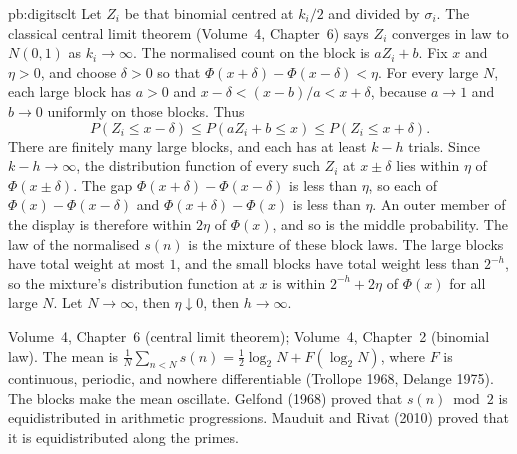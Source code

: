 \begin{solution}{pb:digitsclt}
Let $Z_i$ be that binomial centred at $k_i/2$ and divided by $\sigma_i$. The classical central limit theorem (Volume~4, Chapter~6) says $Z_i$ converges in law to $N(0,1)$ as $k_i\to\infty$. The normalised count on the block is $aZ_i+b$. Fix $x$ and $\eta>0$, and choose $\delta>0$ so that $\Phi(x+\delta)-\Phi(x-\delta)<\eta$. For every large $N$, each large block has $a>0$ and $x-\delta<(x-b)/a<x+\delta$, because $a\to1$ and $b\to0$ uniformly on those blocks. Thus
\[
P(Z_i\le x-\delta)\le P(aZ_i+b\le x)\le P(Z_i\le x+\delta).
\]
There are finitely many large blocks, and each has at least $k-h$ trials. Since $k-h\to\infty$, the distribution function of every such $Z_i$ at $x\pm\delta$ lies within $\eta$ of $\Phi(x\pm\delta)$. The gap $\Phi(x+\delta)-\Phi(x-\delta)$ is less than $\eta$, so each of $\Phi(x)-\Phi(x-\delta)$ and $\Phi(x+\delta)-\Phi(x)$ is less than $\eta$. An outer member of the display is therefore within $2\eta$ of $\Phi(x)$, and so is the middle probability. The law of the normalised $s(n)$ is the mixture of these block laws. The large blocks have total weight at most $1$, and the small blocks have total weight less than $2^{-h}$, so the mixture's distribution function at $x$ is within $2^{-h}+2\eta$ of $\Phi(x)$ for all large $N$. Let $N\to\infty$, then $\eta\downarrow0$, then $h\to\infty$.

\tools Volume~4, Chapter~6 (central limit theorem); Volume~4, Chapter~2 (binomial law).
\leads The mean is $\frac1N\sum_{n<N}s(n)=\frac12\log_2N+F(\log_2N)$, where $F$ is continuous, periodic, and nowhere differentiable
(Trollope 1968, Delange 1975). The blocks make the mean oscillate. Gelfond (1968) proved that $s(n)\bmod2$ is equidistributed in
arithmetic progressions. Mauduit and Rivat (2010) proved that it is equidistributed along the primes.
\end{solution}

